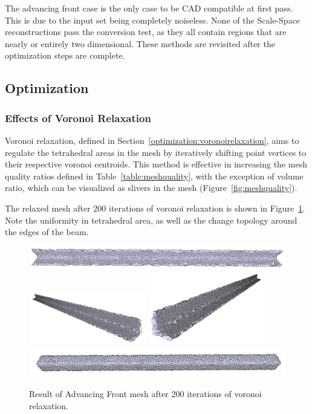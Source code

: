 \documentclass[12pt]{drexelthesis}
\let\Oldsubsection\subsection
\renewcommand{\subsection}{\FloatBarrier\Oldsubsection}
\let\Oldsubsubsection\subsubsection
\renewcommand{\subsubsection}{\FloatBarrier\Oldsubsubsection}
\begin{document}
The advancing front case is the only case to be CAD compatible at first pass. This is due to the input set being completely noiseless. None of the Scale-Space reconstructions pass the conversion test, as they all contain regions that are nearly or entirely two dimensional. These methods are revisited after the optimization steps are complete.

\subsection{Optimization}
\subsubsection{Effects of Voronoi Relaxation}

Voronoi relaxation, defined in Section~\ref{optimization:voronoirelaxation}, aims to regulate the tetrahedral areas in the mesh by iteratively shifting point vertices to their respective voronoi centroids. This method is effective in increasing the mesh quality ratios defined in Table~\ref{table:meshquality}, with the exception of volume ratio, which can be visualized as slivers in the mesh (Figure~\ref{fig:meshquality}).

The relaxed mesh after 200 iterations of voronoi relaxation is shown in Figure~\ref{zeronoise:advancedlloyd}. Note the uniformity in tetrahedral area, as well as the change topology around the edges of the beam.

\begin{figure}[!ht]
	\centering
		\includegraphics[width=5in]{simulated-lab-scan/0noise/optimizedNeat/advancingfrontlloyd00.png}
		\includegraphics[width=2in]{simulated-lab-scan/0noise/optimizedNeat/advancingfrontlloyd01.png}
		\includegraphics[width=2in]{simulated-lab-scan/0noise/optimizedNeat/advancingfrontlloyd02.png}
		\includegraphics[width=5in]{simulated-lab-scan/0noise/optimizedNeat/advancingfrontlloyd03.png}
		\caption[Advancing Front mesh after 200 iterations of voronoi relaxation]{\centering  Result of Advancing Front mesh after 200 iterations of voronoi relaxation.}
	\label{zeronoise:advancedlloyd}
\end{figure}
\end{document}
